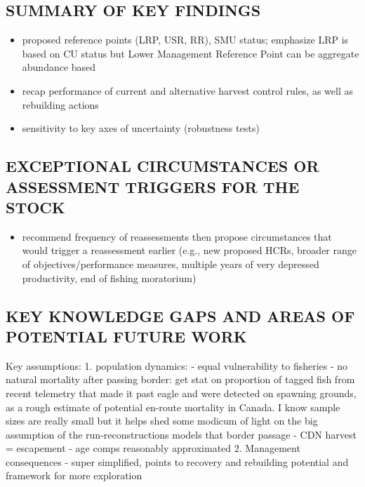 \documentclass[11pt]{book}
\begin{document}
\hypertarget{summary-of-key-findings}{%
\subsection{SUMMARY OF KEY FINDINGS}\label{summary-of-key-findings}}
\begin{itemize}
\item
  proposed reference points (LRP, USR, RR), SMU status; emphasize LRP is based on CU status but Lower Management Reference Point can be aggregate abundance based
\item
  recap performance of current and alternative harvest control rules, as well as rebuilding actions
\item
  sensitivity to key axes of uncertainty (robustness tests)
\end{itemize}
\hypertarget{exceptional-circumstances-or-assessment-triggers-for-the-stock}{%
\subsection{EXCEPTIONAL CIRCUMSTANCES OR ASSESSMENT TRIGGERS FOR THE STOCK}\label{exceptional-circumstances-or-assessment-triggers-for-the-stock}}
\begin{itemize}

\item
  recommend frequency of reassessments then propose circumstances that would trigger a reassessment earlier (e.g., new proposed HCRs, broader range of objectives/performance measures, multiple years of very depressed productivity, end of fishing moratorium)
\end{itemize}
\hypertarget{key-knowledge-gaps-and-areas-of-potential-future-work}{%
\subsection{KEY KNOWLEDGE GAPS AND AREAS OF POTENTIAL FUTURE WORK}\label{key-knowledge-gaps-and-areas-of-potential-future-work}}

Key assumptions: 1. population dynamics: - equal vulnerability to fisheries - no natural mortality after passing border: get stat on proportion of tagged fish from recent telemetry that made it past eagle and were detected on spawning grounds, as a rough estimate of potential en-route mortality in Canada. I know sample sizes are really small but it helps shed some modicum of light on the big assumption of the run-reconstructions models that border passage - CDN harvest = escapement - age comps reasonably approximated 2. Management consequences - super simplified, points to recovery and rebuilding potential and framework for more exploration
\end{document}
